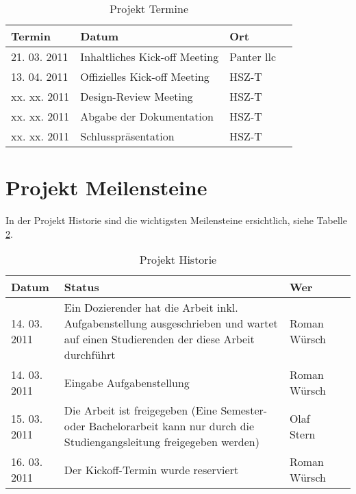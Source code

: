 \documentclass[abstracton, listof=totocnumbered,
bibliography=totocnumbered]{scrreprt}
\begin{document}
  \begin{table}[h]
    \begin{center}
      \begin{tabular}{lp{7cm}ll}
        \toprule
        Termin & Datum & Ort \\
        \midrule
        21. 03. 2011 & Inhaltliches Kick-off Meeting & Panter llc\\
        13. 04. 2011 & Offizielles Kick-off Meeting & HSZ-T\\
        xx. xx. 2011 & Design-Review Meeting & HSZ-T\\
        xx. xx. 2011 & Abgabe der Dokumentation & HSZ-T\\
        xx. xx. 2011 & Schlusspräsentation & HSZ-T\\
        \bottomrule
      \end{tabular}
      \caption{Projekt Termine}
      \label{tab:termine}
    \end{center}
  \end{table}
  
  \section{Projekt Meilensteine}
  
  In der Projekt Historie sind die wichtigsten Meilensteine ersichtlich, siehe
  Tabelle \ref{tab:projekthistorie}.
  \newline
  
  \begin{table}[h]
    \begin{center}
      \begin{tabular}{lp{9cm}ll}
        \toprule
        Datum & Status & Wer \\
        \midrule
        14. 03. 2011 & Ein Dozierender hat die Arbeit inkl. Aufgabenstellung
        ausgeschrieben und wartet auf einen Studierenden der  diese Arbeit
        durchführt & Roman Würsch\\
        14. 03. 2011 & Eingabe Aufgabenstellung & Roman Würsch\\
        15. 03. 2011 & Die Arbeit ist freigegeben (Eine Semester- oder
        Bachelorarbeit kann nur durch die Studiengangsleitung freigegeben
        werden) & Olaf Stern\\
        16. 03. 2011 & Der Kickoff-Termin wurde reserviert & Roman Würsch\\
        \bottomrule
      \end{tabular}
      \caption{Projekt Historie}
      \label{tab:projekthistorie}
    \end{center}
  \end{table}
  
\end{document}
